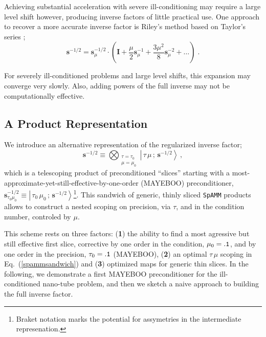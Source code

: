 \documentclass[letterpaper,twocolumn,amsmath,amsfont,amssymb,english,aps,jcp,preprintnumbers,groupaddress,nofootinbib,tightenlines,floatfix]{revtex4}
\newcommand{\mat}[1]{\boldsymbol{#1}}
\theoremstyle{plain}
\theoremstyle{remark}
\theoremstyle{plain}
\begin{document}
Achieving substantial acceleration with severe ill-conditioning  may require a large level shift however, 
producing inverse factors of little practical use.  One approach to recover a more accurate inverse
factor is Riley's method based on Taylor's series \cite{}; 
\begin{equation}
\mat{s}^{-1/2} = \mat{s}^{-1/2}_{\mu} \cdot \left( \mat{I}+\frac{\mu}{2} \mat{s}^{-1}_{\mu}
                                                   +\frac{3 \mu^2}{8} \mat{s}^{-2}_{\mu} + \dots
   \right) \; .
\end{equation}

For severely ill-conditioned problems and large level shifts, this expansion may converge very slowly. 
Also, adding powers of the full inverse may not be computationally effective. 

\subsection{A Product Representation}

We introduce an alternative representation of the regularized inverse factor;
\begin{equation} \label{spammsandwich}
\mat{s}^{-1/2} \equiv \bigotimes_{\substack{\tau=\tau_0 \\ \mu=\mu_0   } } {\left|\, \tau\, \mu \, ; \, \scriptstyle{\mat{s}^{-1/2}}  \right>}  \, ,
\end{equation}
which is a telescoping product of preconditioned ``slices'' 
starting with a most-approximate-yet-still-effective-by-one-order (MAYEBOO) preconditioner, 
$\mat{s}^{-1/2}_{\tau_0 \mu_0} \equiv {\left|\, \tau_0\, \mu_0 \, ; \, \scriptstyle{\mat{s}^{-1/2}}\right>}$\footnote{Braket notation marks 
the potential for assymetries in the intermediate represenation.}.  
This sandwich of generic, thinly sliced {\tt SpAMM} products allows to construct a nested scoping on precision, via $\tau$, and in the 
condition number, controled by $\mu$.

This scheme rests on three factors: ({\bf 1}) the ability to find a most agressive but still effective first slice,   
corrective by one order in the condition, $\mu_0 = {\tt .1}$, and by one order in the precision, $\tau_0 ={\tt .1}$ (MAYEBOO), 
({\bf 2}) an optimal $\tau \, \mu$ scoping in Eq.~(\ref{spammsandwich})  and ({\bf 3}) optimized 
maps for generic thin slices.  In the following, we demonstrate a first MAYEBOO preconditioner for the ill-conditioned 
nano-tube problem, and then we sketch a naive approach to building the full inverse factor. 
\end{document}
